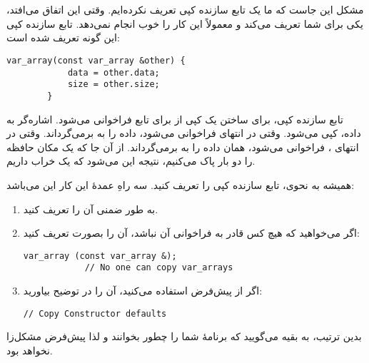 \section{}
\paragraph{}\label{answer:59}
مشکل این جاست که ما یک تابع سازنده کپی تعریف نکرده‌ایم. وقتی این اتفاق می‌افتد،  یکی برای شما تعریف می‌کند و معمولاً این کار را خوب انجام نمی‌دهد. تابع سازنده کپی این گونه تعریف شده است:
\begin{LTR}
    \begin{lstlisting}[style=C++Style]
        var_array(const var_array &other) {
            data = other.data;
            size = other.size;
        }
    \end{lstlisting}
\end{LTR}

تابع سازنده کپی، برای ساختن یک کپی از  برای تابع  فراخوانی می‌شود. اشاره‌گر به داده، کپی می‌شود. وقتی  در انتهای  فراخوانی می‌شود، داده را به  برمی‌گرداند. وقتی در انتهای ،  فراخوانی می‌شود، همان داده را به  برمی‌گرداند. از آن جا که یک مکان حافظه را دو بار پاک می‌کنیم، نتیجه این می‌شود که یک  خراب داریم.

همیشه به نحوی، تابع سازنده کپی را تعریف کنید. سه راهِ عمدهٔ این کار این می‌باشد:
\begin{enumerate}
    \item به طور ضمنی آن را تعریف کنید.
    \item اگر می‌خواهید که هیچ کس قادر به فراخوانی آن نباشد، آن را بصورت  تعریف کنید:
    \begin{LTR}
        \begin{lstlisting}[style=C++Style]
            var_array (const var_array &);
            // No one can copy var_arrays
        \end{lstlisting}
    \end{LTR}

    \item اگر از پیش‌فرض استفاده می‌کنید، آن را در توضیح بیاورید:
    \begin{LTR}
        \begin{lstlisting}[style=C++Style]
            // Copy Constructor defaults
        \end{lstlisting}
    \end{LTR}

\end{enumerate}

بدین ترتیب، به بقیه می‌گویید که برنامهٔ شما را چطور بخوانند و لذا پیش‌فرض  مشکل‌زا نخواهد بود.